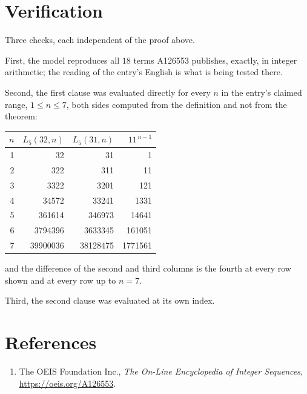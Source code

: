 \documentclass[11pt,a4paper]{article}
\theoremstyle{plain}
\theoremstyle{definition}
\begin{document}
\section{Verification}

Three checks, each independent of the proof above.

First, the model reproduces all $18$ terms A126553 publishes, exactly, in integer
arithmetic; the reading of the entry's English is what is being tested there.

Second, the first clause was evaluated directly for every $n$ in the entry's claimed range,
$1\le n\le7$, both sides computed from the definition and not from the theorem:

\begin{center}
\begin{tabular}{rrrr}
$n$ & $L_{5}(32,n)$ & $L_{5}(31,n)$ & $11^{\,n-1}$ \\ \hline
1 & 32 & 31 & 1 \\
2 & 322 & 311 & 11 \\
3 & 3322 & 3201 & 121 \\
4 & 34572 & 33241 & 1331 \\
5 & 361614 & 346973 & 14641 \\
6 & 3794396 & 3633345 & 161051 \\
7 & 39900036 & 38128475 & 1771561 \\
\end{tabular}
\end{center}

\noindent and the difference of the second and third columns is the fourth at every row shown
and at every row up to $n=7$.

Third, the second clause was evaluated at its own index.

\section*{References}
\begin{enumerate}
\item The OEIS Foundation Inc., \emph{The On-Line Encyclopedia of Integer Sequences},
\url{https://oeis.org/A126553}.
\end{enumerate}
\end{document}
